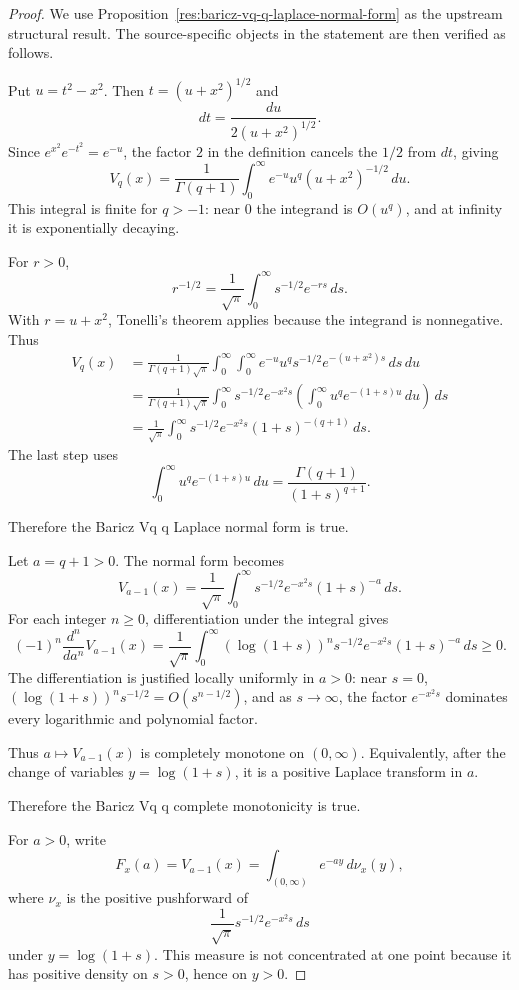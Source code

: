 \documentclass[11pt]{article}
\numberwithin{equation}{section}
\theoremstyle{definition}
\theoremstyle{remark}
\newcommand{\1}{\mathbf 1}
\begin{document}
\begin{proof}
We use Proposition~\ref{res:baricz-vq-q-laplace-normal-form} as the upstream structural result. The source-specific objects in the statement are then verified as follows.

Put \(u=t^2-x^2\). Then \(t=(u+x^2)^{1/2}\) and
\[
dt=\frac{du}{2(u+x^2)^{1/2}}.
\]
Since \(e^{x^2}e^{-t^2}=e^{-u}\), the factor \(2\) in the definition cancels the \(1/2\) from \(dt\), giving
\[
V_q(x)=\frac1{\Gamma(q+1)}
\int_0^\infty e^{-u}u^q(u+x^2)^{-1/2}\,du.
\]
This integral is finite for \(q>-1\): near \(0\) the integrand is \(O(u^q)\), and at infinity it is exponentially decaying.

For \(r>0\),
\[
r^{-1/2}=\frac1{\sqrt\pi}\int_0^\infty s^{-1/2}e^{-rs}\,ds.
\]
With \(r=u+x^2\), Tonelli's theorem applies because the integrand is nonnegative. Thus
\[
\begin{aligned}
V_q(x)
&=\frac1{\Gamma(q+1)\sqrt\pi}
\int_0^\infty\int_0^\infty
e^{-u}u^q s^{-1/2}e^{-(u+x^2)s}\,ds\,du\\
&=\frac1{\Gamma(q+1)\sqrt\pi}
\int_0^\infty s^{-1/2}e^{-x^2s}
\left(\int_0^\infty u^q e^{-(1+s)u}\,du\right)\,ds\\
&=\frac1{\sqrt\pi}\int_0^\infty
s^{-1/2}e^{-x^2s}(1+s)^{-(q+1)}\,ds.
\end{aligned}
\]
The last step uses
\[
\int_0^\infty u^q e^{-(1+s)u}\,du
=\frac{\Gamma(q+1)}{(1+s)^{q+1}}.
\]

Therefore the Baricz Vq q Laplace normal form is true.

Let \(a=q+1>0\). The normal form becomes
\[
V_{a-1}(x)=\frac1{\sqrt\pi}\int_0^\infty
s^{-1/2}e^{-x^2s}(1+s)^{-a}\,ds.
\]
For each integer \(n\ge0\), differentiation under the integral gives
\[
(-1)^n\frac{d^n}{da^n}V_{a-1}(x)
=\frac1{\sqrt\pi}\int_0^\infty
(\log(1+s))^n s^{-1/2}e^{-x^2s}(1+s)^{-a}\,ds\ge0.
\]
The differentiation is justified locally uniformly in \(a>0\): near \(s=0\), \((\log(1+s))^n s^{-1/2}=O(s^{n-1/2})\), and as \(s\to\infty\), the factor \(e^{-x^2s}\) dominates every logarithmic and polynomial factor.

Thus \(a\mapsto V_{a-1}(x)\) is completely monotone on \((0,\infty)\). Equivalently, after the change of variables \(y=\log(1+s)\), it is a positive Laplace transform in \(a\).

Therefore the Baricz Vq q complete monotonicity is true.

For \(a>0\), write
\[
F_x(a)=V_{a-1}(x)
=\int_{(0,\infty)} e^{-ay}\,d\nu_x(y),
\]
where \(\nu_x\) is the positive pushforward of
\[
\frac1{\sqrt\pi}s^{-1/2}e^{-x^2s}\,ds
\]
under \(y=\log(1+s)\). This measure is not concentrated at one point because it has positive density on \(s>0\), hence on \(y>0\).


\end{proof}
\end{document}
